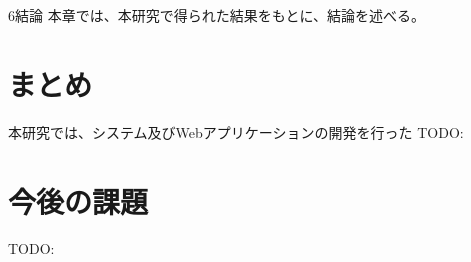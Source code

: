 \chapterhead
{6}{結論}
{本章では、本研究で得られた結果をもとに、結論を述べる。}

\section{まとめ}
本研究では、システム及びWebアプリケーションの開発を行った
TODO:

\newpage

\section{今後の課題}
TODO:
